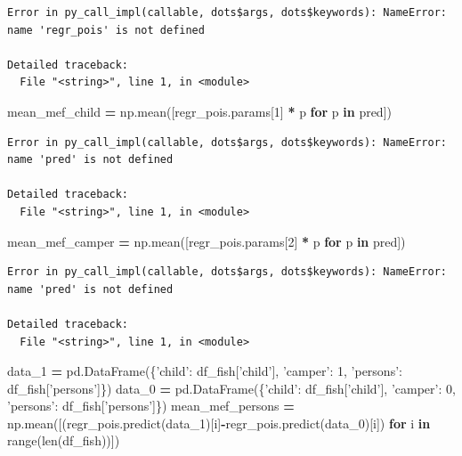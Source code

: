 \documentclass[]{book}
\newenvironment{Shaded}{\begin{snugshade}}{\end{snugshade}}
\newcommand{\BuiltInTok}[1]{#1}
\newcommand{\ControlFlowTok}[1]{\textcolor[rgb]{0.13,0.29,0.53}{\textbf{#1}}}
\newcommand{\DecValTok}[1]{\textcolor[rgb]{0.00,0.00,0.81}{#1}}
\newcommand{\KeywordTok}[1]{\textcolor[rgb]{0.13,0.29,0.53}{\textbf{#1}}}
\newcommand{\NormalTok}[1]{#1}
\newcommand{\OperatorTok}[1]{\textcolor[rgb]{0.81,0.36,0.00}{\textbf{#1}}}
\newcommand{\StringTok}[1]{\textcolor[rgb]{0.31,0.60,0.02}{#1}}
\begin{document}
\begin{verbatim}
Error in py_call_impl(callable, dots$args, dots$keywords): NameError: name 'regr_pois' is not defined

Detailed traceback: 
  File "<string>", line 1, in <module>
\end{verbatim}

\begin{Shaded}
\begin{Highlighting}[]
\NormalTok{mean_mef_child }\OperatorTok{=}\NormalTok{ np.mean([regr_pois.params[}\DecValTok{1}\NormalTok{] }\OperatorTok{*}\NormalTok{ p }\ControlFlowTok{for}\NormalTok{ p }\KeywordTok{in}\NormalTok{ pred])}
\end{Highlighting}
\end{Shaded}

\begin{verbatim}
Error in py_call_impl(callable, dots$args, dots$keywords): NameError: name 'pred' is not defined

Detailed traceback: 
  File "<string>", line 1, in <module>
\end{verbatim}

\begin{Shaded}
\begin{Highlighting}[]
\NormalTok{mean_mef_camper }\OperatorTok{=}\NormalTok{ np.mean([regr_pois.params[}\DecValTok{2}\NormalTok{] }\OperatorTok{*}\NormalTok{ p }\ControlFlowTok{for}\NormalTok{ p }\KeywordTok{in}\NormalTok{ pred])}
\end{Highlighting}
\end{Shaded}

\begin{verbatim}
Error in py_call_impl(callable, dots$args, dots$keywords): NameError: name 'pred' is not defined

Detailed traceback: 
  File "<string>", line 1, in <module>
\end{verbatim}

\begin{Shaded}
\begin{Highlighting}[]
\NormalTok{data_1 }\OperatorTok{=}\NormalTok{ pd.DataFrame(\{}\StringTok{'child'}\NormalTok{: df_fish[}\StringTok{'child'}\NormalTok{], }\StringTok{'camper'}\NormalTok{: }\DecValTok{1}\NormalTok{, }\StringTok{'persons'}\NormalTok{: df_fish[}\StringTok{'persons'}\NormalTok{]\})}
\NormalTok{data_0 }\OperatorTok{=}\NormalTok{ pd.DataFrame(\{}\StringTok{'child'}\NormalTok{: df_fish[}\StringTok{'child'}\NormalTok{], }\StringTok{'camper'}\NormalTok{: }\DecValTok{0}\NormalTok{, }\StringTok{'persons'}\NormalTok{: df_fish[}\StringTok{'persons'}\NormalTok{]\})}
\NormalTok{mean_mef_persons }\OperatorTok{=}\NormalTok{ np.mean([(regr_pois.predict(data_1)[i]}\OperatorTok{-}\NormalTok{regr_pois.predict(data_0)[i]) }
                            \ControlFlowTok{for}\NormalTok{ i }\KeywordTok{in} \BuiltInTok{range}\NormalTok{(}\BuiltInTok{len}\NormalTok{(df_fish))])}
\end{Highlighting}
\end{Shaded}
\end{document}
